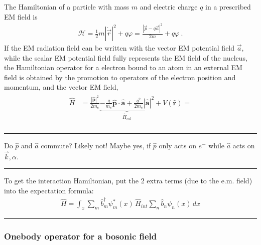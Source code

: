 \documentclass[letterpaper,10pt,english]{jupyterBook}
\begin{document}
\sphinxAtStartPar
{} The Hamiltonian of a particle with mass \(m\) and electric charge \(q\) in a prescribed EM field is
\begin{equation*}
\begin{split}\mathcal{H} = \frac{1}{2} m \left| \dot{\vec{r}} \right|^2 + q \varphi = \frac{|\vec{p} - q \vec{a}|^2}{2 m} + q \varphi \ .\end{split}
\end{equation*}
\sphinxAtStartPar
If the EM radiation field can be written with the vector EM potential field \(\vec{a}\), while the scalar EM potential field fully represents the EM field of the nucleus, the Hamiltonian operator for a electron bound to an atom in an external EM field is obtained by the promotion to operators of the electron position and momentum, and the vector EM field,
\begin{equation*}
\begin{split}\begin{aligned}
  \hat{H} 
  & = \frac{\left| \hat{ \mathbf{p} } \right|^2}{2m_e} \underbrace{ - \frac{q}{m_e} \hat{\mathbf{p}} \cdot \hat{\mathbf{a}} + \frac{q^2}{2m_e} \left| \hat{\mathbf{a}} \right|^2}_{\hat{H}_{int}} + V(\hat{\mathbf{r}}) = \\
\end{aligned}\end{split}
\end{equation*}

\bigskip\hrule\bigskip


\sphinxAtStartPar
Do \(\hat p\) and \(\hat a\) commute? Likely not! Maybe yes, if \(\hat p\) only acts on \(e^-\) while \(\hat a\) acts on \(\vec k,\alpha\).


\bigskip\hrule\bigskip


\sphinxAtStartPar
To get the interaction Hamiltonian, put the 2 extra terms (due to the e.m. field) into the expectation formula:
\begin{equation*}
\begin{split}
\hat H=\int_x\sum_m\hat b_m^\dagger\psi_m^*(x)\,\hat H_{int}\sum_n\hat b_n\psi_n(x)\,dx
\end{split}
\end{equation*}

\bigskip\hrule\bigskip

\subsubsection*{One\sphinxhyphen{}body operator for a bosonic field}
\end{document}

